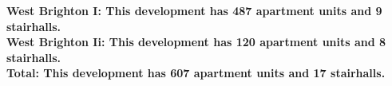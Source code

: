 \bf{West Brighton I}: This development has 487 apartment units and 9 stairhalls.\\\bf{West Brighton Ii}: This development has 120 apartment units and 8 stairhalls.\\\bf{Total}: This development has 607 apartment units and 17 stairhalls.\\